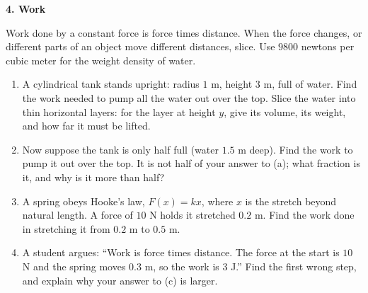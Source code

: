 \documentclass[11pt]{article}
\newcommand{\prob}[1]{\medskip\noindent\textbf{\large #1}\par\smallskip}
\begin{document}
\newpage
\prob{4. Work}
Work done by a constant force is force times distance. When the force changes, or different
parts of an object move different distances, slice. Use $9800$ newtons per cubic meter for the
weight density of water.
\begin{enumerate}
\item A cylindrical tank stands upright: radius $1$ m, height $3$ m, full of water. Find the work
needed to pump all the water out over the top. Slice the water into thin horizontal layers:
for the layer at height $y$, give its volume, its weight, and how far it must be lifted.

\item Now suppose the tank is only half full (water $1.5$ m deep). Find the work to pump it out over
the top. It is not half of your answer to (a); what fraction is it, and why is it more than
half?

\item A spring obeys Hooke's law, $F(x)=kx$, where $x$ is the stretch beyond natural length. A force
of $10$ N holds it stretched $0.2$ m. Find the work done in stretching it from $0.2$ m to
$0.5$ m.

\item A student argues: ``Work is force times distance. The force at the start is $10$ N and the
spring moves $0.3$ m, so the work is $3$ J.'' Find the first wrong step, and explain why your
answer to (c) is larger.

\end{enumerate}
\end{document}
